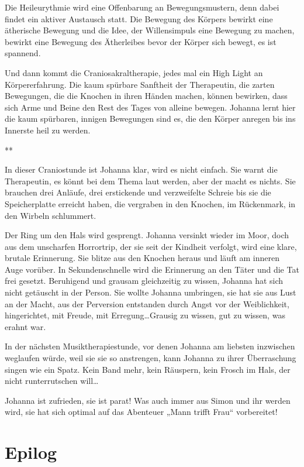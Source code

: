 \documentclass[10pt,titlepage,a5paper]{book}
\newcommand{\sterne}{\par{\centering ***\par}}
\begin{document}
Die Heileurythmie wird eine Offenbarung an Bewegungsmustern, denn dabei findet ein aktiver Austausch statt. Die Bewegung des Körpers bewirkt eine ätherische Bewegung und die Idee, der Willensimpuls eine Bewegung zu machen, bewirkt eine Bewegung des Ätherleibes bevor der Körper sich bewegt, es ist spannend.

Und dann kommt die Craniosakraltherapie, jedes mal ein High Light an Körpererfahrung. Die kaum spürbare Sanftheit der Therapeutin, die zarten Bewegungen, die die Knochen in ihren Händen machen, können bewirken, dass sich Arme und Beine den Rest des Tages von alleine bewegen. Johanna lernt hier die kaum spürbaren, innigen Bewegungen sind es, die den Körper anregen bis ins Innerste heil zu werden.

\sterne

In dieser Craniostunde ist Johanna klar, wird  es nicht einfach. Sie warnt die Therapeutin, es könnt bei dem Thema laut werden, aber der macht es nichts. Sie brauchen drei Anläufe, drei erstickende und verzweifelte Schreie bis sie die Speicherplatte erreicht haben, die vergraben in den Knochen, im Rückenmark, in den Wirbeln schlummert.

Der Ring um den Hals wird gesprengt. Johanna versinkt wieder im Moor, doch aus dem unscharfen Horrortrip, der sie seit der Kindheit verfolgt, wird eine klare, brutale Erinnerung. Sie blitze aus den Knochen heraus und läuft am inneren Auge vorüber. In Sekundenschnelle wird die Erinnerung an den Täter und die Tat frei gesetzt. Beruhigend und grausam gleichzeitig zu wissen, Johanna hat sich nicht getäuscht in der Person. Sie wollte Johanna umbringen, sie hat sie aus Lust an der Macht, aus der Perversion entstanden durch Angst vor der Weiblichkeit, hingerichtet, mit Freude, mit Erregung\dots  Grausig zu wissen, gut zu wissen, was erahnt war.

In der nächsten Musiktherapiestunde, vor denen Johanna am liebsten inzwischen weglaufen würde, weil sie sie so anstrengen, kann Johanna zu ihrer Überraschung singen wie ein Spatz. Kein Band mehr, kein Räuspern, kein Frosch im Hals, der nicht runterrutschen will\dots 

Johanna ist zufrieden, sie ist parat! Was auch immer aus Simon und ihr werden wird, sie hat sich optimal auf das Abenteuer „Mann trifft Frau“ vorbereitet! 


\chapter*{Epilog}
 
\end{document}
